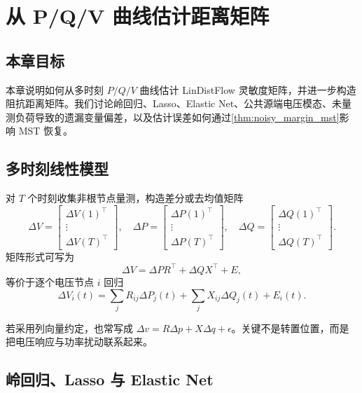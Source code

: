 \chapter{从 P/Q/V 曲线估计距离矩阵}
\label{chap:estimation}

\section*{本章目标}
本章说明如何从多时刻 $P/Q/V$ 曲线估计 LinDistFlow 灵敏度矩阵，并进一步构造阻抗距离矩阵。我们讨论岭回归、Lasso、Elastic Net、公共源端电压模态、未量测负荷导致的遗漏变量偏差，以及估计误差如何通过\cref{thm:noisy_margin_mst}影响 MST 恢复。

\section{多时刻线性模型}

对 $T$ 个时刻收集非根节点量测，构造差分或去均值矩阵
\begin{equation}
  \Delta V =
  \begin{bmatrix}
    \Delta V(1)^\top\\
    \vdots\\
    \Delta V(T)^\top
  \end{bmatrix},\quad
  \Delta P =
  \begin{bmatrix}
    \Delta P(1)^\top\\
    \vdots\\
    \Delta P(T)^\top
  \end{bmatrix},\quad
  \Delta Q =
  \begin{bmatrix}
    \Delta Q(1)^\top\\
    \vdots\\
    \Delta Q(T)^\top
  \end{bmatrix}.
\end{equation}
矩阵形式可写为
\begin{equation}
  \Delta V = \Delta P R^\top + \Delta Q X^\top + E,
  \label{eq:regression_matrix}
\end{equation}
等价于逐个电压节点 $i$ 回归
\begin{equation}
  \Delta V_i(t)=
  \sum_j R_{ij}\Delta P_j(t)+
  \sum_j X_{ij}\Delta Q_j(t)+E_i(t).
\end{equation}

若采用列向量约定，也常写成 $\Delta v=R\Delta p+X\Delta q+\epsilon$。关键不是转置位置，而是把电压响应与功率扰动联系起来。

\section{岭回归、Lasso 与 Elastic Net}


